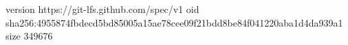 version https://git-lfs.github.com/spec/v1
oid sha256:4955874fbdecd5bd85005a15ae78cee09f21bdd8be84f041220aba1d4da939a1
size 349676

